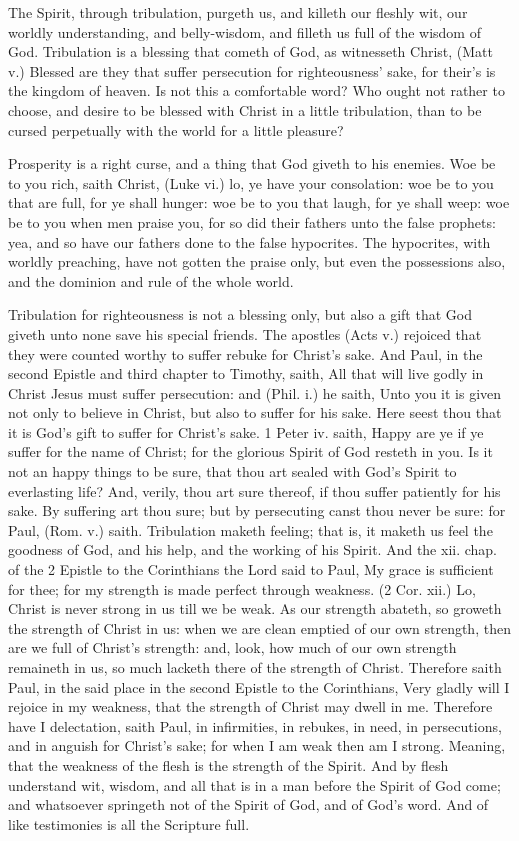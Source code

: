 The Spirit, through tribulation, purgeth us, 
and killeth our fleshly wit, our worldly understanding,
and belly-wisdom, and filleth us full of 
the wisdom of God. Tribulation is a blessing 
that cometh of God, as witnesseth Christ, (Matt v.) 
Blessed are they that suffer persecution for 
righteousness' sake, for their's is the kingdom of 
heaven. Is not this a comfortable word? Who 
ought not rather to choose, and desire to be blessed 
with Christ in a little tribulation, than to be cursed 
perpetually with the world for a little pleasure? 

Prosperity is a right curse, and a thing that 
God giveth to his enemies. Woe be to you 
rich, saith Christ, (Luke vi.) lo, ye have your 
consolation: woe be to you that are full, for ye 
shall hunger: woe be to you that laugh, for ye 
shall weep: woe be to you when men praise you, 
for so did their fathers unto the false prophets: yea, 
and so have our fathers done to the false hypocrites. 
The hypocrites, with worldly preaching, have not 
gotten the praise only, but even the possessions 
also, and the dominion and rule of the whole world. 

Tribulation for righteousness is not a blessing 
only, but also a gift that God giveth unto none 
save his special friends. The apostles (Acts v.) 
rejoiced that they were counted worthy to suffer 
rebuke for Christ's sake. And Paul, in the second 
Epistle and third chapter to Timothy, saith, All 
that will live godly in Christ Jesus must suffer 
persecution: and (Phil. i.) he saith, Unto you it is 
given not only to believe in Christ, but also to suffer 
for his sake. Here seest thou that it is God's gift 
to suffer for Christ's sake. 1 Peter iv. saith, Happy 
are ye if ye suffer for the name of Christ; for the 
glorious Spirit of God resteth in you. Is it not an 
happy things to be sure, that thou art sealed with 
God's Spirit to everlasting life? And, verily, thou 
art sure thereof, if thou suffer patiently for his 
sake. By suffering art thou sure; but by persecuting
canst thou never be sure: for Paul, 
(Rom. v.) saith. Tribulation maketh feeling; that 
is, it maketh us feel the goodness of God, and 
his help, and the working of his Spirit. And the
xii. chap. of the 2 Epistle to the Corinthians the
Lord said to Paul, My grace is sufficient for thee;
for my strength is made perfect through weakness.
(2 Cor. xii.) Lo, Christ is never strong in 
us till we be weak. As our strength abateth, so 
groweth the strength of Christ in us: when we 
are clean emptied of our own strength, then are
we full of Christ's strength: and, look, how much
of our own strength remaineth in us, so much 
lacketh there of the strength of Christ. Therefore
saith Paul, in the said place in the second 
Epistle to the Corinthians, Very gladly will I 
rejoice in my weakness, that the strength of 
Christ may dwell in me. Therefore have I delectation,
saith Paul, in infirmities, in rebukes, in 
need, in persecutions, and in anguish for Christ's 
sake; for when I am weak then am I strong. 
Meaning, that the weakness of the flesh is the 
strength of the Spirit. And by flesh understand
wit, wisdom, and all that is in a man before the 
Spirit of God come; and whatsoever springeth 
not of the Spirit of God, and of God's word. And
of like testimonies is all the Scripture full.

